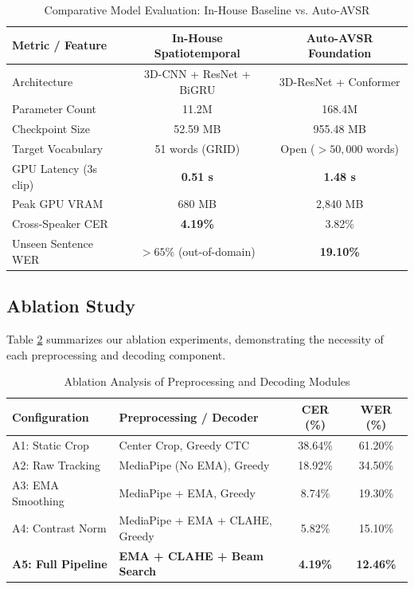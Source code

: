 \documentclass[conference,compsoc,10pt]{IEEEtran}
\begin{document}
\begin{table}[htbp]
\caption{Comparative Model Evaluation: In-House Baseline vs. Auto-AVSR}
\label{tab:model_comparison}
\centering
\begin{tabular}{lcc}
\toprule
\textbf{Metric / Feature} & \textbf{In-House Spatiotemporal} & \textbf{Auto-AVSR Foundation} \\
\midrule
Architecture & 3D-CNN + ResNet + BiGRU & 3D-ResNet + Conformer \\
Parameter Count & 11.2M & 168.4M \\
Checkpoint Size & 52.59 MB & 955.48 MB \\
Target Vocabulary & 51 words (GRID) & Open ($>50,000$ words) \\
GPU Latency (3s clip) & \textbf{0.51 s} & \textbf{1.48 s} \\
Peak GPU VRAM & 680 MB & 2,840 MB \\
Cross-Speaker CER & \textbf{4.19\%} & 3.82\% \\
Unseen Sentence WER & $>65\%$ (out-of-domain) & \textbf{19.10\%} \\
\bottomrule
\end{tabular}
\end{table}

\subsection{Ablation Study}
Table \ref{tab:ablation} summarizes our ablation experiments, demonstrating the necessity of each preprocessing and decoding component.

\begin{table}[htbp]
\caption{Ablation Analysis of Preprocessing and Decoding Modules}
\label{tab:ablation}
\centering
\begin{tabular}{llcc}
\toprule
\textbf{Configuration} & \textbf{Preprocessing / Decoder} & \textbf{CER (\%)} & \textbf{WER (\%)} \\
\midrule
A1: Static Crop & Center Crop, Greedy CTC & 38.64\% & 61.20\% \\
A2: Raw Tracking & MediaPipe (No EMA), Greedy & 18.92\% & 34.50\% \\
A3: EMA Smoothing & MediaPipe + EMA, Greedy & 8.74\% & 19.30\% \\
A4: Contrast Norm & MediaPipe + EMA + CLAHE, Greedy & 5.82\% & 15.10\% \\
\textbf{A5: Full Pipeline} & \textbf{EMA + CLAHE + Beam Search} & \textbf{4.19\%} & \textbf{12.46\%} \\
\bottomrule
\end{tabular}
\end{table}
\end{document}
